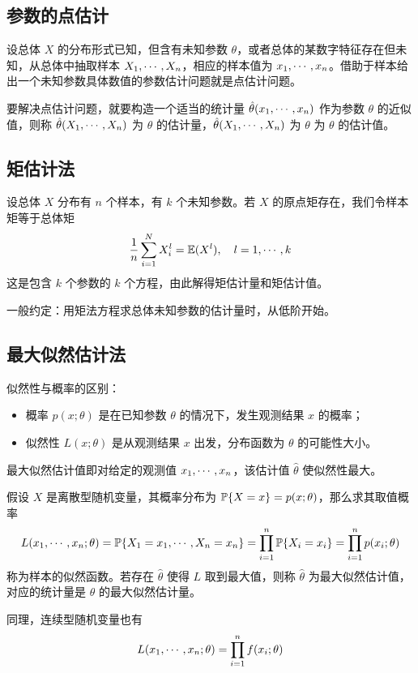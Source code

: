 \subsection{参数的点估计}

设总体 $X$ 的分布形式已知，但含有未知参数 $\theta$，或者总体的某数字特征存在但未知，从总体中抽取样本 $X_1,\cdots,X_n$，相应的样本值为 $x_1,\cdots,x_n$。借助于样本给出一个未知参数具体数值的参数估计问题就是点估计问题。

要解决点估计问题，就要构造一个适当的统计量 $\hat{\theta}(x_1,\cdots,x_n)$ 作为参数 $\theta$ 的近似值，则称 $\hat{\theta}(X_1,\cdots,X_n)$ 为 $\theta$ 的估计量，$\hat{\theta}(X_1,\cdots,X_n)$ 为 $\theta$ 为 $\theta$ 的估计值。

\subsection{矩估计法}

设总体 $X$ 分布有 $n$ 个样本，有 $k$ 个未知参数。若 $X$ 的原点矩存在，我们令样本矩等于总体矩
\[ \frac{1}{n} \sum_{i=1}^{N} X_i^l = \mathbb{E}(X^l), \quad l = 1, \cdots, k \]
这是包含 $k$ 个参数的 $k$ 个方程，由此解得矩估计量和矩估计值。

一般约定：用矩法方程求总体未知参数的估计量时，从低阶开始。

\subsection{最大似然估计法}

似然性与概率的区别：
\begin{itemize}
	\item 概率 $p(x;\theta)$ 是在已知参数 $\theta$ 的情况下，发生观测结果 $x$ 的概率；
	\item 似然性 $L(x; \theta)$ 是从观测结果 $x$ 出发，分布函数为 $\theta$ 的可能性大小。
\end{itemize}

最大似然估计值即对给定的观测值 $x_1,\cdots,x_n$，该估计值 $\hat{\theta}$ 使似然性最大。

假设 $X$ 是离散型随机变量，其概率分布为 $\mathbb{P}\{X = x\} = p(x; \theta)$，那么求其取值概率
\[ L(x_1,\cdots,x_n;\theta) = \mathbb{P}\{X_1 = x_1, \cdots, X_n = x_n\} = \prod_{i=1}^n \mathbb{P}\{X_i=x_i\} = \prod_{i=1}^n p(x_i; \theta) \]
称为样本的似然函数。若存在 $\hat{\theta}$ 使得 $L$ 取到最大值，则称 $\hat{\theta}$ 为最大似然估计值，对应的统计量是 $\theta$ 的最大似然估计量。

同理，连续型随机变量也有
\[ L(x_1,\cdots,x_n; \theta) = \prod_{i=1}^n f(x_i; \theta) \]

